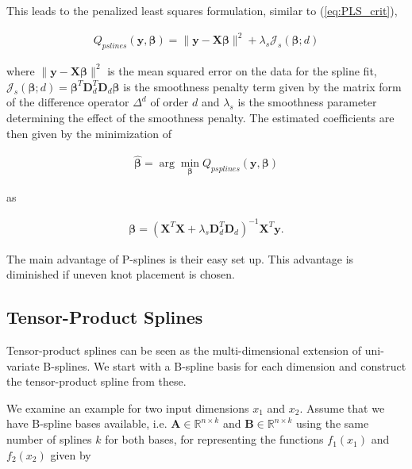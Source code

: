 \documentclass[10pt,a4paper]{article}
\begin{document}
This leads to the penalized least squares formulation, similar to (\ref{eq:PLS_crit}),

\begin{align} \label{eq:OF_psplines}
	Q_{pslines}(\boldsymbol{y}, \boldsymbol{\beta}) = \lVert \boldsymbol{y} - \boldsymbol{X} \boldsymbol{\beta}\rVert^2 + \lambda_s \mathcal J_s(\boldsymbol{\beta};d)
\end{align}

where $\lVert \boldsymbol{y} - \boldsymbol{X} \boldsymbol{\beta} \rVert^2$ is the mean squared error on the data for the spline fit, $\mathcal J_s(\boldsymbol{\beta};d) = \boldsymbol{\beta}^T \boldsymbol{D}_d^T \boldsymbol{D}_d \boldsymbol{\beta}$ is the smoothness penalty term given by the matrix form of the difference operator $\Delta^d$ of order $d$ and $\lambda_s$ is the smoothness parameter determining the effect of the smoothness penalty. The estimated coefficients are then given by the minimization of

\begin{align}
	\boldsymbol{\hat{\beta}} = \arg \min_{\boldsymbol{\beta}} Q_{psplines}(\boldsymbol{y}, \boldsymbol{\beta})
\end{align}

as

\begin{align}
	\boldsymbol{\beta} = (\boldsymbol{X}^T \boldsymbol{X} + \lambda_s \boldsymbol{D}_d^T \boldsymbol{D}_d)^{-1} \boldsymbol{X}^T \boldsymbol{y}.
\end{align}

The main advantage of P-splines is their easy set up. This advantage is diminished if uneven knot placement is chosen. 

\subsection{Tensor-Product Splines}

Tensor-product splines can be seen as the multi-dimensional extension of uni-variate B-splines. We start with a B-spline basis for each dimension and construct the tensor-product spline from these. 

We examine an example for two input dimensions $x_1$ and $x_2$. Assume that we have B-spline bases available, i.e. $\boldsymbol{A} \in \mathbb{R}^{n \times k}$ and $\boldsymbol{B} \in \mathbb{R}^{n \times k}$ using the same number of splines $k$ for both bases, for representing the functions $f_1(x_1)$ and $f_2(x_2)$ given by
\end{document}

